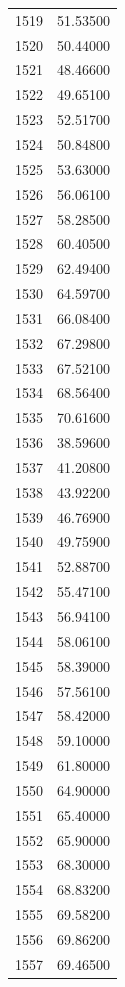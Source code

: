 \documentclass[
  letterpaper,
  DIV=11,
  numbers=noendperiod]{scrreprt}
\begin{document}
\begin{tcolorbox}
\begin{tabular}{lr}
1519 &         51.53500 \\
1520 &         50.44000 \\
1521 &         48.46600 \\
1522 &         49.65100 \\
1523 &         52.51700 \\
1524 &         50.84800 \\
1525 &         53.63000 \\
1526 &         56.06100 \\
1527 &         58.28500 \\
1528 &         60.40500 \\
1529 &         62.49400 \\
1530 &         64.59700 \\
1531 &         66.08400 \\
1532 &         67.29800 \\
1533 &         67.52100 \\
1534 &         68.56400 \\
1535 &         70.61600 \\
1536 &         38.59600 \\
1537 &         41.20800 \\
1538 &         43.92200 \\
1539 &         46.76900 \\
1540 &         49.75900 \\
1541 &         52.88700 \\
1542 &         55.47100 \\
1543 &         56.94100 \\
1544 &         58.06100 \\
1545 &         58.39000 \\
1546 &         57.56100 \\
1547 &         58.42000 \\
1548 &         59.10000 \\
1549 &         61.80000 \\
1550 &         64.90000 \\
1551 &         65.40000 \\
1552 &         65.90000 \\
1553 &         68.30000 \\
1554 &         68.83200 \\
1555 &         69.58200 \\
1556 &         69.86200 \\
1557 &         69.46500 \\

\end{tabular}
\end{tcolorbox}
\end{document}
